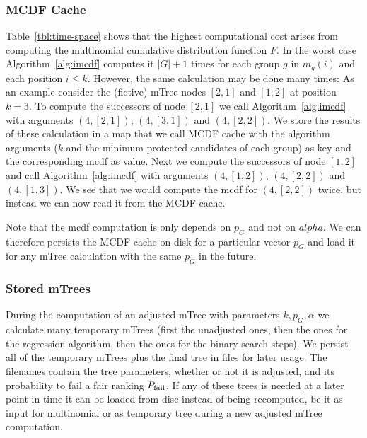 \subsubsection{MCDF Cache}\label{subsubsec:mcdf-cache}
Table~\ref{tbl:time-space} shows that the highest computational cost arises from computing the multinomial cumulative distribution function $F$.
%
In the worst case Algorithm~\ref{alg:imcdf} computes it $|G|+1$ times for each group $g$ in $m_g(i)$ and each position $i\leq k$.
%
However, the same calculation may be done many times:
%
As an example consider the (fictive) mTree nodes $[2,1]$ and $[1,2]$ at position $k=3$.
%
To compute the successors of node $[2,1]$ we call Algorithm~\ref{alg:imcdf} with arguments $(4,[2,1])$, $(4,[3,1])$ and $(4,[2,2])$.
%
We store the results of these calculation in a map that we call MCDF cache with the algorithm arguments ($k$ and the minimum protected candidates of each group) as key and the corresponding mcdf as value.
%
Next we compute the successors of node $[1,2]$ and call Algorithm~\ref{alg:imcdf} with arguments $(4,[1,2])$, $(4,[2,2])$ and $(4,[1,3])$.
%
We see that we would compute the mcdf for $(4,[2,2])$ twice, but instead we can now read it from the MCDF cache.


Note that the mcdf computation is only depends on $p_G$ and not on $alpha$.
%
We can therefore persists the MCDF cache on disk for a particular vector $p_G$ and load it for any mTree calculation with the same $p_G$ in the future.

\subsubsection{Stored mTrees}
\label{subsubsec:stored-mtrees}
During the computation of an adjusted mTree with parameters $k,p_G , \alpha$ we calculate many temporary mTrees (first the unadjusted ones, then the ones for the regression algorithm, then the ones for the binary search steps).
%
We persist all of the temporary mTrees plus the final tree in files for later usage.
%
The filenames contain the tree parameters, whether or not it is adjusted, and its probability to fail a fair ranking $P_{\operatorname{fail}}$.
%
If any of these trees is needed at a later point in time it can be loaded from disc instead of being recomputed, be it as input for multinomial \algoFAIR or as temporary tree during a new adjusted mTree computation.

